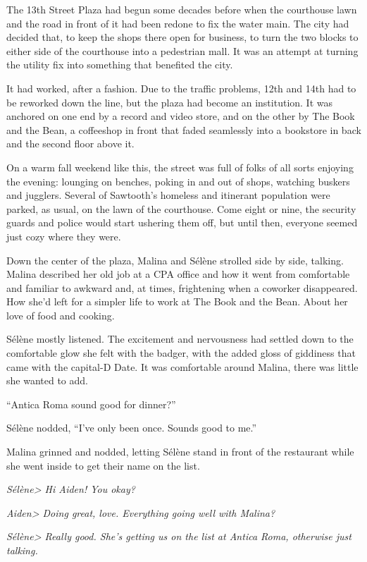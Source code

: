 The 13th Street Plaza had begun some decades before when the courthouse lawn and the road in front of it had been redone to fix the water main. The city had decided that, to keep the shops there open for business, to turn the two blocks to either side of the courthouse into a pedestrian mall. It was an attempt at turning the utility fix into something that benefited the city.

It had worked, after a fashion. Due to the traffic problems, 12th and 14th had to be reworked down the line, but the plaza had become an institution. It was anchored on one end by a record and video store, and on the other by The Book and the Bean, a coffeeshop in front that faded seamlessly into a bookstore in back and the second floor above it.

On a warm fall weekend like this, the street was full of folks of all sorts enjoying the evening: lounging on benches, poking in and out of shops, watching buskers and jugglers. Several of Sawtooth's homeless and itinerant population were parked, as usual, on the lawn of the courthouse. Come eight or nine, the security guards and police would start ushering them off, but until then, everyone seemed just cozy where they were.

Down the center of the plaza, Malina and Sélène strolled side by side, talking. Malina described her old job at a CPA office and how it went from comfortable and familiar to awkward and, at times, frightening when a coworker disappeared. How she'd left for a simpler life to work at The Book and the Bean. About her love of food and cooking.

Sélène mostly listened. The excitement and nervousness had settled down to the comfortable glow she felt with the badger, with the added gloss of giddiness that came with the capital-D Date. It was comfortable around Malina, there was little she wanted to add.

``Antica Roma sound good for dinner?''

Sélène nodded, ``I've only been once. Sounds good to me.''

Malina grinned and nodded, letting Sélène stand in front of the restaurant while she went inside to get their name on the list.

\emph{Sélène\textgreater{} Hi Aiden! You okay?}

\emph{Aiden\textgreater{} Doing great, love. Everything going well with Malina?}

\emph{Sélène\textgreater{} Really good. She's getting us on the list at Antica Roma, otherwise just talking.}

